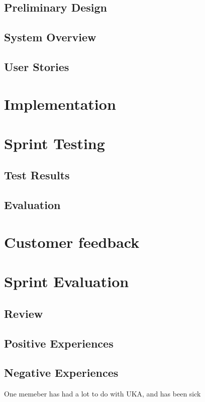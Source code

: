 \documentclass{report}
\begin{document}
\subsection{Preliminary Design} \label{subsec:prelim_design}
\subsection{System Overview} \label{subsec:sys_overview}
\subsection{User Stories} \label{subsec:user_stories}
\section{Implementation} \label{sec:implementation}
\section{Sprint Testing} \label{sec:sprint_testing}
\subsection{Test Results} \label{subsec:test_results}
\subsection{Evaluation} \label{subsec:evaluation}
\section{Customer feedback} \label{sec:cust_feed}
\section{Sprint Evaluation} \label{sec:sprint_eva}
\subsection{Review} \label{subsec:review}
\subsection{Positive Experiences} \label{subsec:pos_exp}
\subsection{Negative Experiences} \label{subsec:neg_exp}
One memeber has had a lot to do with UKA, and has been sick
\end{document}
